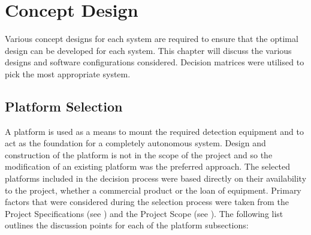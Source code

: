\documentclass[main.tex]{subfiles}
\begin{document}
\chapter{Concept Design}
Various concept designs for each system are required to ensure that the optimal design can be developed for each system. This chapter will discuss the various designs and software configurations considered. Decision matrices were utilised to pick the most appropriate system.
\section{Platform Selection}
A platform is used as a means to mount the required detection equipment and to act as the foundation for a completely autonomous system.  Design and construction of the platform is not in the scope of the project and so the modification of an existing platform was the preferred approach. The selected platforms included in the decision process were based directly on their availability to the project, whether a commercial product or the loan of equipment. Primary factors that were considered during the selection process were taken from the Project Specifications (see ) and the Project Scope (see ). The following list outlines the discussion points for each of the platform subsections:
\end{document}
